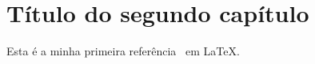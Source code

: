 
\chapter{Título do segundo capítulo}

Esta é a minha primeira referência~\cite{cap2:prf} em \LaTeX.

\amostradetexto

